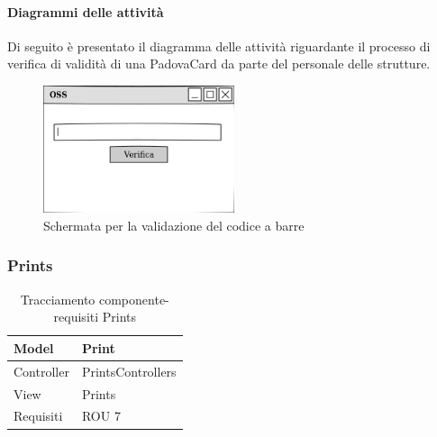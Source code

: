 \paragraph{Diagrammi delle attività}
Di seguito è presentato il diagramma delle attività riguardante il processo di verifica di validità di una PadovaCard da parte del personale delle strutture.
\begin{figure}[H]
\centering
\includegraphics[width=0.5\textwidth]{images/mockup_leggi_barcode.png}
\caption{Schermata per la validazione del codice a barre\label{validazionecodicebarre}}
\end{figure}


\subsubsection{Prints}
\def\arraystretch{2}
\begin{table}[H]
\centering
\begin{tabular}{|l|l|}
\hline
Model & Print \\ \hline
Controller & PrintsControllers \\ \hline
View & Prints \\ \hline
Requisiti & ROU 7 \\ \hline
\end{tabular}
\caption{Tracciamento componente-requisiti Prints}
\end{table}


